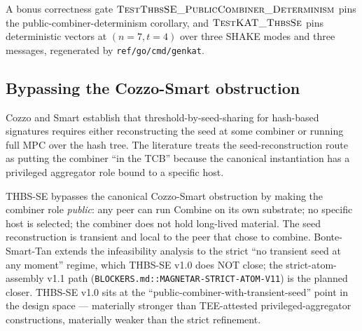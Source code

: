 A bonus correctness gate
$\textsc{TestThbsSE\_PublicCombiner\_Determinism}$ pins the
public-combiner-determinism corollary, and
$\textsc{TestKAT\_ThbsSe}$ pins deterministic vectors at
$(n=7, t=4)$ over three SHAKE modes and three messages, regenerated
by \texttt{ref/go/cmd/genkat}.

\subsection{Bypassing the Cozzo-Smart obstruction}
\label{sec:thbsse:cosmin-smart}

Cozzo and Smart \cite{cosmin2021} establish that
threshold-by-seed-sharing for hash-based signatures requires
either reconstructing the seed at some combiner or running full
MPC over the hash tree. The literature treats the
seed-reconstruction route as putting the combiner ``in the TCB''
because the canonical instantiation has a privileged aggregator
role bound to a specific host.

THBS-SE bypasses the canonical Cozzo-Smart obstruction by making
the combiner role \emph{public}: any peer can run Combine on its
own substrate; no specific host is selected; the combiner does
not hold long-lived material. The seed reconstruction is
transient and local to the peer that chose to combine.
Bonte-Smart-Tan \cite{bonte2023threshold} extends the
infeasibility analysis to the strict
``no transient seed at any moment'' regime, which THBS-SE
v1.0 does NOT close; the strict-atom-assembly v1.1 path
(\texttt{BLOCKERS.md::MAGNETAR-STRICT-ATOM-V11}) is the planned
closer. THBS-SE v1.0 sits at the
``public-combiner-with-transient-seed'' point in the design
space --- materially stronger than TEE-attested
privileged-aggregator constructions, materially weaker than the
strict refinement.

